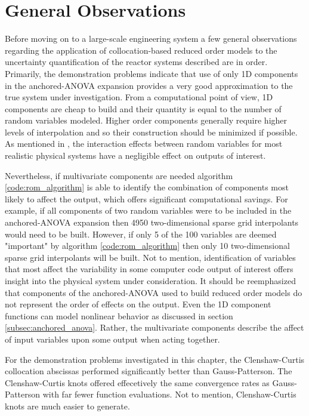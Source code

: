\section{General Observations}
\label{sec:general_observations}

Before moving on to a large-scale engineering system a few general observations regarding the application of collocation-based reduced order models to the uncertainty quantification of the  reactor systems described are in order. Primarily, the demonstration problems indicate that use of only 1D components in the anchored-\ac{ANOVA} expansion provides a very good approximation to the true system under investigation. From a computational point of view, 1D components are cheap to build and their quantity is equal to the number of random variables modeled. Higher order components generally require higher levels of interpolation and so their construction should be minimized if possible. As mentioned in \cite{AHSGC_HighDimensions}, the interaction effects between random variables for most realistic physical systems have a negligible effect on outputs of interest. 

Nevertheless, if multivariate components are needed algorithm \ref{code:rom_algorithm} is able to identify the combination of components most likely to affect the output, which offers significant computational savings. For example, if all components of two random variables were to be included in the anchored-\ac{ANOVA} expansion then 4950 two-dimensional sparse grid interpolants would need to be built. However, if only 5 of the 100 variables are deemed "important" by algorithm \ref{code:rom_algorithm} then only 10 two-dimensional sparse grid interpolants will be built. Not to mention, identification of variables that most affect the variability in some computer code output of interest offers insight into the physical system under consideration. It should be reemphasized that components of the anchored-\ac{ANOVA} used to build reduced order models do not represent the order of effects on the output. Even the 1D component functions can model nonlinear behavior as discussed in section \ref{subsec:anchored_anova}. Rather, the multivariate components describe the affect of input variables upon some output when acting together.    

For the demonstration problems investigated in this chapter, the Clenshaw-Curtis collocation abscissas performed significantly better than Gauss-Patterson. The Clenshaw-Curtis knots offered effecetively the same convergence rates as Gauss-Patterson with far fewer function evaluations. Not to mention, Clenshaw-Curtis knots are much easier to generate. 

